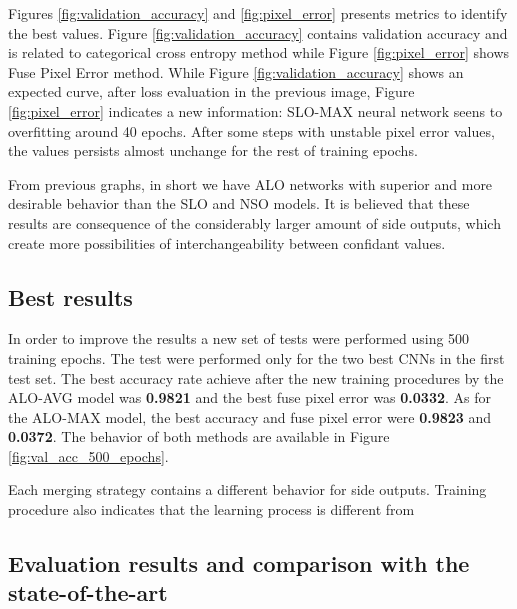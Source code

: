 Figures \ref{fig:validation_accuracy} and \ref{fig:pixel_error} presents metrics to identify the best values. Figure \ref{fig:validation_accuracy} contains validation accuracy and is related to categorical cross entropy method while Figure \ref{fig:pixel_error} shows Fuse Pixel Error method. While Figure \ref{fig:validation_accuracy} shows an expected curve, after loss evaluation in the previous image, Figure \ref{fig:pixel_error} indicates a new information: SLO-MAX neural network seens to overfitting around 40 epochs. After some steps with unstable pixel error values, the values persists almost unchange for the rest of training epochs. 

From previous graphs, in short we have ALO networks with  superior and more desirable behavior than the SLO and NSO models. It is believed that these results are consequence of the considerably larger amount of side outputs, which create more possibilities of interchangeability between confidant values.

\subsection{Best results}

In order to improve the results a new set of tests were performed using 500 training epochs. The test were performed only for the two best CNNs in the first test set. The best accuracy rate achieve after the new training procedures by the ALO-AVG model was \textbf{0.9821} and the best fuse pixel error was \textbf{0.0332}. As for the ALO-MAX model, the best accuracy and fuse pixel error were \textbf{0.9823} and \textbf{0.0372}. The behavior of both methods are available in Figure \ref{fig:val_acc_500_epochs}.

Each merging strategy contains a different behavior for side outputs. Training procedure also indicates that the learning process is different from 

{\color{green}{Adicionar informacao sobre os resultados do conjunto de testes}}

\subsection{Evaluation results and comparison with the state-of-the-art}

